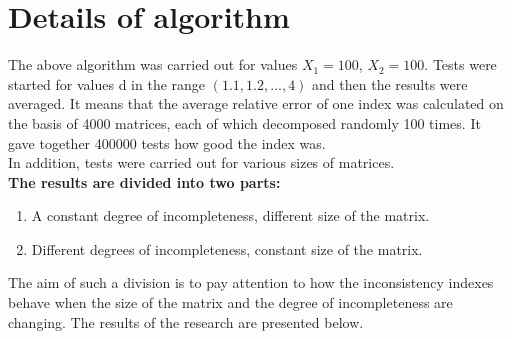 \section{Details of algorithm}
The above algorithm was carried out for values $X_{1}=100$, $X_{2}=100$. Tests were started for values d in the range $\left(1.1,1.2,...,4\right)$ and then the results were averaged. It means that the average relative error of one index was calculated on the basis of 4000 matrices, each of which decomposed randomly 100 times. It gave together 400000 tests how good the index was. 
\\

In addition, tests were carried out for various sizes of matrices.\\
\textbf{The results are divided into two parts:}
\begin{enumerate}
  \item A constant degree of incompleteness, different size of the matrix.
  \item Different degrees of incompleteness, constant size of the matrix.
\end{enumerate}

The aim of such a division is to pay attention to how the inconsistency indexes behave when the size of the matrix and the degree of incompleteness are changing. The results of the research are presented below.